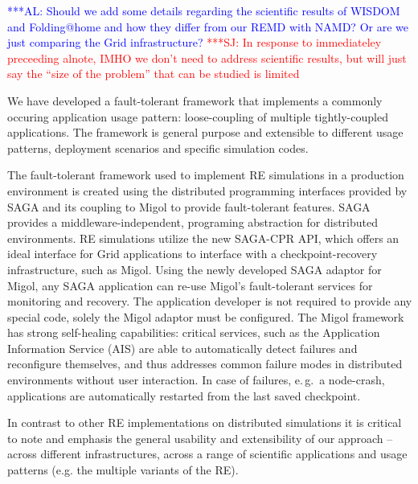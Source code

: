 \documentclass[conference,final]{IEEEtran}
\newcommand{\up}{\vspace*{-1em}}
\newcommand{\alnote}[1]{ {\textcolor{blue} { ***AL: #1 }}}
\newcommand{\jhanote}[1]{ {\textcolor{red} { ***SJ: #1 }}}
\newcommand{\alnote}[1]{}
\newcommand{\jhanote}[1]{}
\begin{document}
\alnote{Should we add some details regarding the scientific results of
  WISDOM and Folding@home and how they differ from our REMD with NAMD?
  Or are we just comparing the Grid infrastructure?}  \jhanote{In
  response to immediateley preceeding alnote, IMHO we don't need to
  address scientific results, but will just say the ``size of the
  problem'' that can be studied is limited}

% 

\up
{}

\up We have developed a fault-tolerant framework that implements a
commonly occuring application usage pattern: loose-coupling of
multiple tightly-coupled applications. The framework is general
purpose and extensible to different usage patterns, deployment
scenarios and specific simulation codes.

The fault-tolerant framework used to implement RE simulations in a
production environment is created using the distributed programming
interfaces provided by SAGA and its coupling to Migol to provide
fault-tolerant features.  SAGA provides a middleware-independent,
programing abstraction for distributed environments. RE simulations
utilize the new SAGA-CPR API, which offers an ideal interface for
Grid applications to interface with a checkpoint-recovery
infrastructure, such as Migol. Using the newly developed SAGA adaptor
for Migol, any SAGA application can re-use Migol's fault-tolerant
services for monitoring and recovery.  The application developer is
not required to provide any special code, solely the Migol adaptor
must be configured.  The Migol framework has strong self-healing
capabilities: critical services, such as the Application Information
Service (AIS) are able to automatically detect failures and
reconfigure themselves, and thus addresses common failure modes in
distributed environments without user interaction.
In case of failures, e.\,g.\ a node-crash, applications are
automatically restarted from the last saved
checkpoint. %

In contrast to other RE implementations on distributed
simulations it is critical to note and emphasis the general usability
and extensibility of our approach -- across different infrastructures,
across a range of scientific applications and usage patterns (e.g.
the multiple variants of the RE).
\end{document}
